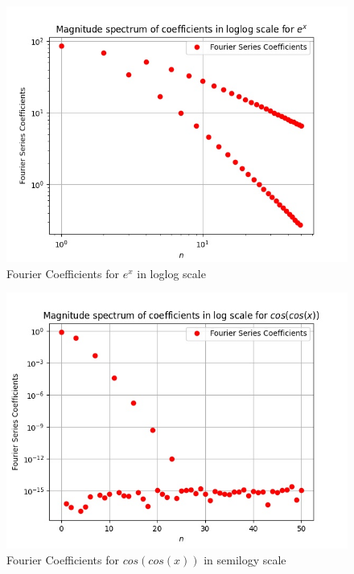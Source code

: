 \documentclass{article}
\begin{document}
\begin{figure}[!tbh]
    \centering
    \includegraphics[scale=0.65]{plots/Magnitude spectrum of coefficients in loglog scale for $e^x$.jpg}
    \caption{Fourier Coefficients for $e^x$ in loglog scale}
    \label{fig:Figure 4}
    \end{figure}

\begin{figure}[!tbh]
    \centering
    \includegraphics[scale=0.65]{plots/Magnitude spectrum of coefficients in log scale for $cos(cos(x))$.jpg}
    \caption{Fourier Coefficients for $cos(cos(x))$ in semilogy scale}
    \label{fig:Figure 5}
    \end{figure}
\end{document}
